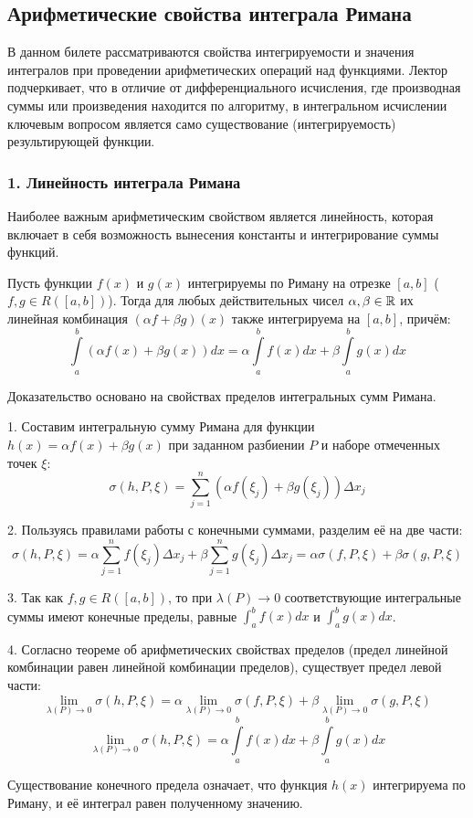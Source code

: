 \subsection{Арифметические свойства интеграла Римана}

В данном билете рассматриваются свойства интегрируемости и значения интегралов при проведении арифметических операций над функциями. Лектор подчеркивает, что в отличие от дифференциального исчисления, где производная суммы или произведения находится по алгоритму, в интегральном исчислении ключевым вопросом является само существование (интегрируемость) результирующей функции.

\subsubsection*{1. Линейность интеграла Римана}

Наиболее важным арифметическим свойством является линейность, которая включает в себя возможность вынесения константы и интегрирование суммы функций.

\begin{theorem}[Линейность]
Пусть функции $f(x)$ и $g(x)$ интегрируемы по Риману на отрезке $[a, b]$ ($f, g \in R([a, b])$). Тогда для любых действительных чисел $\alpha, \beta \in \mathbb{R}$ их линейная комбинация $(\alpha f + \beta g)(x)$ также интегрируема на $[a, b]$, причём:
\[ \int\limits_a^b (\alpha f(x) + \beta g(x)) dx = \alpha \int\limits_a^b f(x) dx + \beta \int\limits_a^b g(x) dx \]
\end{theorem}

\begin{tcolorbox}[title=Доказательство, breakable]
Доказательство основано на свойствах пределов интегральных сумм Римана.

1. Составим интегральную сумму Римана для функции $h(x) = \alpha f(x) + \beta g(x)$ при заданном разбиении $P$ и наборе отмеченных точек $\xi$:
\[ \sigma(h, P, \xi) = \sum_{j=1}^n (\alpha f(\xi_j) + \beta g(\xi_j)) \Delta x_j \]

2. Пользуясь правилами работы с конечными суммами, разделим её на две части:
\[ \sigma(h, P, \xi) = \alpha \sum_{j=1}^n f(\xi_j) \Delta x_j + \beta \sum_{j=1}^n g(\xi_j) \Delta x_j = \alpha \sigma(f, P, \xi) + \beta \sigma(g, P, \xi) \]

3. Так как $f, g \in R([a, b])$, то при $\lambda(P) \to 0$ соответствующие интегральные суммы имеют конечные пределы, равные $\int_a^b f(x) dx$ и $\int_a^b g(x) dx$.

4. Согласно теореме об арифметических свойствах пределов (предел линейной комбинации равен линейной комбинации пределов), существует предел левой части:
\[ \lim_{\lambda(P) \to 0} \sigma(h, P, \xi) = \alpha \lim_{\lambda(P) \to 0} \sigma(f, P, \xi) + \beta \lim_{\lambda(P) \to 0} \sigma(g, P, \xi) \]
\[ \lim_{\lambda(P) \to 0} \sigma(h, P, \xi) = \alpha \int\limits_a^b f(x) dx + \beta \int\limits_a^b g(x) dx \]

Существование конечного предела означает, что функция $h(x)$ интегрируема по Риману, и её интеграл равен полученному значению.
\end{tcolorbox}

